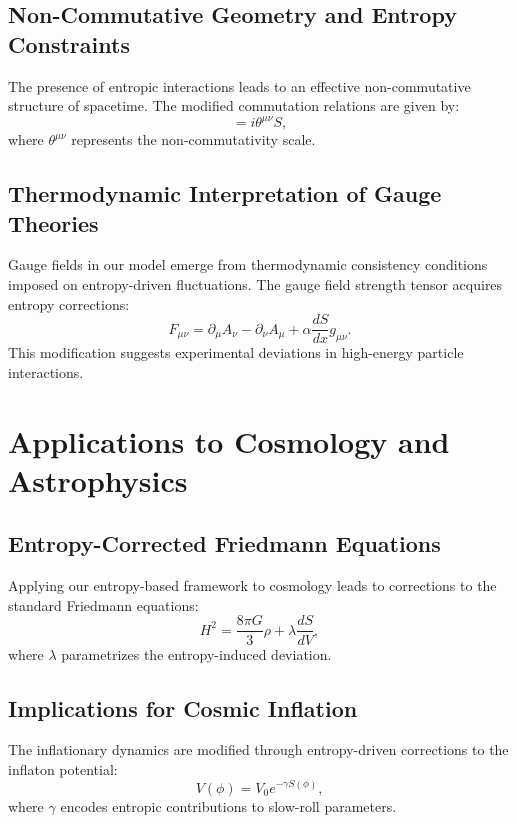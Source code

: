 \documentclass{article}
\begin{document}
\subsection{Non-Commutative Geometry and Entropy Constraints}
The presence of entropic interactions leads to an effective non-commutative structure of spacetime. The modified commutation relations are given by:
\begin{equation}
[x^\mu, x^\nu] = i\theta^{\mu\nu} S,
\end{equation}
where $\theta^{\mu\nu}$ represents the non-commutativity scale.

\subsection{Thermodynamic Interpretation of Gauge Theories}
Gauge fields in our model emerge from thermodynamic consistency conditions imposed on entropy-driven fluctuations. The gauge field strength tensor acquires entropy corrections:
\begin{equation}
F_{\mu\nu} = \partial_\mu A_\nu - \partial_\nu A_\mu + \alpha \frac{dS}{dx} g_{\mu\nu}.
\end{equation}
This modification suggests experimental deviations in high-energy particle interactions.

\section{Applications to Cosmology and Astrophysics}

\subsection{Entropy-Corrected Friedmann Equations}
Applying our entropy-based framework to cosmology leads to corrections to the standard Friedmann equations:
\begin{equation}
H^2 = \frac{8\pi G}{3} \rho + \lambda \frac{dS}{dV},
\end{equation}
where $\lambda$ parametrizes the entropy-induced deviation.

\subsection{Implications for Cosmic Inflation}
The inflationary dynamics are modified through entropy-driven corrections to the inflaton potential:
\begin{equation}
V(\phi) = V_0 e^{-\gamma S(\phi)},
\end{equation}
where $\gamma$ encodes entropic contributions to slow-roll parameters.
\end{document}

